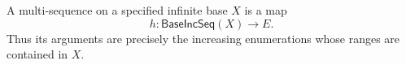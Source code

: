 \begin{definition}
A multi-sequence on a specified infinite base $X$ is a map
\[
h:\mathsf{BaseIncSeq}(X)\longrightarrow E.
\]
Thus its arguments are precisely the increasing enumerations whose ranges
are contained in $X$.
\end{definition}
